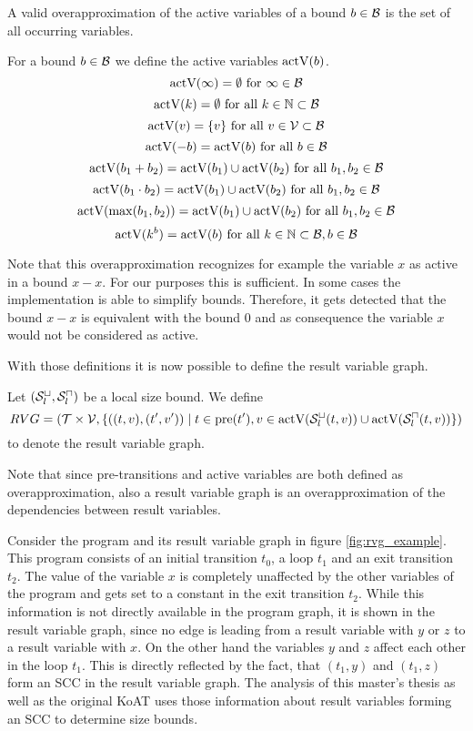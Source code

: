 A valid overapproximation of the active variables of a bound $b \in \mathcal{B}$ is the set of all occurring variables.
\begin{definition}
  For a bound $b \in \mathcal{B}$ we define the active variables $\text{actV}(b)$.
  \[ \text{actV}(\infty) = \emptyset \text{ for } \infty \in \mathcal{B} \]
  \[ \text{actV}(k) = \emptyset \text{ for all } k \in \mathbb{N} \subset \mathcal{B} \] 
  \[ \text{actV}(v) = \lbrace v \rbrace \text{ for all } v \in \mathcal{V} \subset \mathcal{B} \] 
  \[ \text{actV}(-b) = \text{actV}(b) \text{ for all } b \in \mathcal{B} \] 
  \[ \text{actV}(b_1 + b_2) = \text{actV}(b_1) \cup \text{actV}(b_2) \text{ for all } b_1, b_2 \in \mathcal{B} \] 
  \[ \text{actV}(b_1 \cdot b_2) = \text{actV}(b_1) \cup \text{actV}(b_2) \text{ for all } b_1, b_2 \in \mathcal{B} \] 
  \[ \text{actV}(\max(b_1, b_2)) = \text{actV}(b_1) \cup \text{actV}(b_2) \text{ for all } b_1, b_2 \in \mathcal{B} \]
  \[ \text{actV}(k^b) = \text{actV}(b) \text{ for all } k \in \mathbb{N} \subset \mathcal{B}, b \in \mathcal{B} \]  
\end{definition}

Note that this overapproximation recognizes for example the variable $x$ as active in a bound $x - x$.
For our purposes this is sufficient.
In some cases the implementation is able to simplify bounds.
Therefore, it gets detected that the bound $x - x$ is equivalent with the bound $0$ and as consequence the variable $x$ would not be considered as active.

With those definitions it is now possible to define the result variable graph.

\begin{definition}
	Let ${({\mathcal{S}^\sqcup_l}, {\mathcal{S}^\sqcap_l})}$ be a local size bound.
	We define 
	\[ RVG = (\mathcal{T} \times \mathcal{V}, \lbrace ((t, v), (t', v')) \mid t \in \text{pre}(t'), v \in \text{actV}({\mathcal{S}^\sqcup_l}(t,v)) \cup \text{actV}({\mathcal{S}^\sqcap_l}(t,v)) \rbrace) \]
	to denote the result variable graph.
\end{definition}

Note that since pre-transitions and active variables are both defined as overapproximation, also a result variable graph is an overapproximation of the dependencies between result variables.

Consider the program and its result variable graph in figure \ref{fig:rvg_example}.
This program consists of an initial transition $t_0$, a loop $t_1$ and an exit transition $t_2$.
The value of the variable $x$ is completely unaffected by the other variables of the program and gets set to a constant in the exit transition $t_2$.
While this information is not directly available in the program graph, it is shown in the result variable graph, since no edge is leading from a result variable with $y$ or $z$ to a result variable with $x$.
On the other hand the variables $y$ and $z$ affect each other in the loop $t_1$.
This is directly reflected by the fact, that $(t_1,y)$ and $(t_1,z)$ form an SCC in the result variable graph.
The analysis of this master's thesis as well as the original KoAT uses those information about result variables forming an SCC to determine size bounds.
